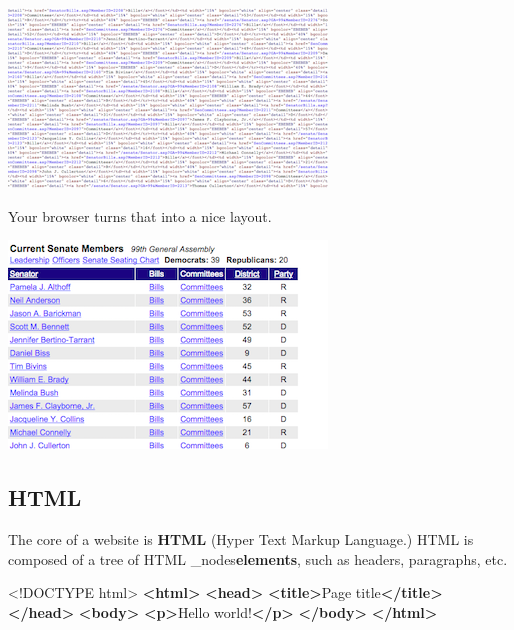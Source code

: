 \documentclass[]{book}
\newenvironment{Shaded}{\begin{snugshade}}{\end{snugshade}}
\newcommand{\KeywordTok}[1]{\textcolor[rgb]{0.13,0.29,0.53}{\textbf{#1}}}
\newcommand{\DataTypeTok}[1]{\textcolor[rgb]{0.13,0.29,0.53}{#1}}
\newcommand{\NormalTok}[1]{#1}
\begin{document}
\begin{center}\includegraphics[width=0.7\linewidth]{img/html} \end{center}

Your browser turns that into a nice layout.

\begin{center}\includegraphics[width=0.7\linewidth]{img/layout} \end{center}

\subsection{HTML}\label{html}

The core of a website is \textbf{HTML} (Hyper Text Markup Language.)
HTML is composed of a tree of HTML \_nodes\textbf{elements}, such as
headers, paragraphs, etc.

\begin{Shaded}
\begin{Highlighting}[]
\DataTypeTok{<!DOCTYPE }\NormalTok{html}\DataTypeTok{>}
\KeywordTok{<html>}
    \KeywordTok{<head>}
        \KeywordTok{<title>}\NormalTok{Page title}\KeywordTok{</title>}
    \KeywordTok{</head>}
    \KeywordTok{<body>}
        \KeywordTok{<p>}\NormalTok{Hello world!}\KeywordTok{</p>}
    \KeywordTok{</body>}
\KeywordTok{</html>}
\end{Highlighting}
\end{Shaded}
\end{document}
